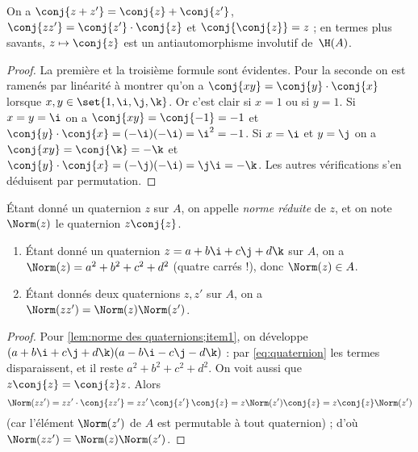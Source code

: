 \documentclass[11pt, useosf,
  title in boldface,
  theorem in new line,
  theorem numbering = section,
  number theorems separately,
]{simplivre}
\begin{document}
    \begin{lemma}
        On a \( \conj{z+z'} = \conj{z}+\conj{z'} \), \( \conj{z z'} = \conj{z'}\cdot\conj{z} \) et \( \conj{\conj{z}} = z \) ; en termes plus savants, \( z \mapsto \conj{z} \) est un antiautomorphisme involutif de~\( \H(A) \).
    \end{lemma}
    \begin{proof}
        La première et la troisième formule sont évidentes. Pour la seconde on est ramenés par linéarité à montrer qu'on a \( \conj{xy} = \conj{y} \cdot \conj{x} \) lorsque \( x,y \in \set{1,\i,\j,\k} \). Or c'est clair si \( x = 1 \) ou si \( y = 1 \). Si \( x = y = \i \) on a \( \conj{xy} = \conj{-1} = -1 \) et \( \conj{y} \cdot \conj{x} = (-\i)(-\i) = \i^2 = -1 \). Si \( x = \i \) et \( y = \j \) on a \( \conj{xy} = \conj{\k} = -\k \) et \( \conj{y} \cdot \conj{x} = (-\j)(-\i) = \j\i = -\k \). Les autres vérifications s'en déduisent par permutation.
    \end{proof}

    Étant donné un quaternion \( z \) sur \( A \), on appelle \emph{norme réduite} de \( z \), et on note \( \Norm(z) \) le quaternion \( z \conj{z} \).

    \begin{lemma}\label{lem:norme des quaternions}
        \begin{enumerate}
            \item \label{lem:norme des quaternions;item1} Étant donné un quaternion \( z = a+b\i+c\j+d\k \) sur \( A \), on a \( \Norm(z) = a^2+b^2+c^2+d^2 \) (quatre carrés !), donc \( \Norm(z) \in A \).
            \item \label{lem:norme des quaternions;item2} Étant donnés deux quaternions \( z, z' \) sur \( A \), on a \( \Norm(zz') = \Norm(z)\Norm(z') \).
        \end{enumerate}
    \end{lemma}
    \begin{proof}
        Pour \ref{lem:norme des quaternions;item1}, on développe \( (a+b\i+c\j+d\k)(a-b\i-c\j-d\k) \) : par \eqref{eq:quaternion} les termes  disparaissent, et il reste \( a^2+b^2+c^2+d^2 \). On voit aussi que \( z \conj{z} = \conj{z} z \). Alors
        \[
            \Norm(zz') = zz' \cdot \conj{zz'} = zz' \,\conj{z'} \,\conj{z} = z \Norm(z') \conj{z} = z \conj{z} \Norm(z')
        \]
        (car l'élément \( \Norm(z') \) de \( A \) est permutable à tout quaternion) ; d'où \( \Norm(zz') = \Norm(z)\Norm(z') \).
    \end{proof}
\end{document}
